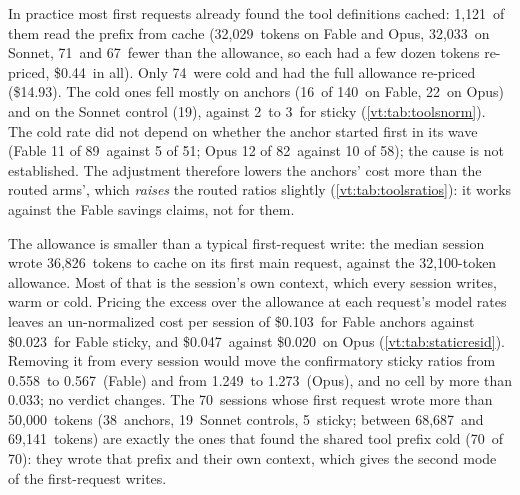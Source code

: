 \documentclass[11pt,letterpaper]{article}
\newcommand{\CfFableStickyPair}{0.558}
\newcommand{\CfOpusStickyPair}{1.249}
\newcommand{\NStickyPerHost}{140}
\newcommand{\RgBigAnchors}{38}
\newcommand{\RgBigHigh}{69{,}141}
\newcommand{\RgBigInCold}{70}
\newcommand{\RgBigLow}{68{,}687}
\newcommand{\RgBigN}{70}
\newcommand{\RgBigSonnet}{19}
\newcommand{\RgBigSticky}{5}
\newcommand{\RgBigThreshold}{50{,}000}
\newcommand{\RgResidAdjFableSticky}{0.567}
\newcommand{\RgResidAdjOpusSticky}{1.273}
\newcommand{\RgResidFableAnchor}{0.103}
\newcommand{\RgResidFableSticky}{0.023}
\newcommand{\RgResidOpusAnchor}{0.047}
\newcommand{\RgResidOpusSticky}{0.020}
\newcommand{\RgResidShiftMax}{0.033}
\newcommand{\RgStaticMedian}{36{,}826}
\newcommand{\RvAllowGapFable}{71}
\newcommand{\RvAllowGapSonnet}{67}
\newcommand{\RvColdFableAnchor}{16}
\newcommand{\RvColdFableSticky}{2}
\newcommand{\RvColdFirstFable}{11 of 89}
\newcommand{\RvColdFirstOpus}{12 of 82}
\newcommand{\RvColdNotFirstFable}{5 of 51}
\newcommand{\RvColdNotFirstOpus}{10 of 58}
\newcommand{\RvColdOpusAnchor}{22}
\newcommand{\RvColdOpusSticky}{3}
\newcommand{\RvColdSonnet}{19}
\newcommand{\RvColdTotal}{74}
\newcommand{\RvColdUSD}{14.93}
\newcommand{\RvWarmReadFable}{32{,}029}
\newcommand{\RvWarmReadSonnet}{32{,}033}
\newcommand{\RvWarmTotal}{1{,}121}
\newcommand{\RvWarmUSD}{0.44}
\newcommand{\ToolsAllowance}{32{,}100}
\begin{document}
In practice most first requests already found the tool definitions cached: \RvWarmTotal\ of them read the prefix
from cache (\RvWarmReadFable\ tokens on Fable and Opus, \RvWarmReadSonnet\ on Sonnet, \RvAllowGapFable\ and \RvAllowGapSonnet\ fewer than the
allowance, so each had a few dozen tokens re-priced, \$\RvWarmUSD\ in all). Only \RvColdTotal\ were cold and had the
full allowance re-priced (\$\RvColdUSD). The cold ones fell mostly on anchors (\RvColdFableAnchor\ of \NStickyPerHost\ on Fable,
\RvColdOpusAnchor\ on Opus) and on the Sonnet control (\RvColdSonnet), against \RvColdFableSticky\ to
\RvColdOpusSticky\ for sticky (\cref{vt:tab:toolsnorm}). The cold rate did not depend on whether the anchor started
first in its wave (Fable \RvColdFirstFable\ against \RvColdNotFirstFable; Opus \RvColdFirstOpus\ against
\RvColdNotFirstOpus); the cause is not established. The adjustment therefore lowers the anchors' cost more than the routed arms', which \emph{raises} the routed
ratios slightly (\cref{vt:tab:toolsratios}): it works against the Fable savings claims, not for them.

The allowance is smaller than a typical first-request write: the median session wrote \RgStaticMedian\ tokens to
cache on its first main request, against the \ToolsAllowance-token allowance. Most of that is the session's own
context, which every session writes, warm or cold. Pricing the excess over the allowance at each request's model
rates leaves an un-normalized cost per session of \$\RgResidFableAnchor\ for Fable anchors against
\$\RgResidFableSticky\ for Fable sticky, and \$\RgResidOpusAnchor\ against \$\RgResidOpusSticky\ on Opus
(\cref{vt:tab:staticresid}). Removing it from every session would move the confirmatory sticky ratios from
\CfFableStickyPair\ to \RgResidAdjFableSticky\ (Fable) and from \CfOpusStickyPair\ to \RgResidAdjOpusSticky\ (Opus),
and no cell by more than \RgResidShiftMax; no verdict changes. The \RgBigN\ sessions whose first request wrote more
than \RgBigThreshold\ tokens (\RgBigAnchors\ anchors, \RgBigSonnet\ Sonnet controls, \RgBigSticky\ sticky; between
\RgBigLow\ and \RgBigHigh\ tokens) are exactly the ones that found the shared tool prefix cold (\RgBigInCold\ of
\RgBigN): they wrote that prefix and their own context, which gives the second mode of the first-request writes.
\end{document}
